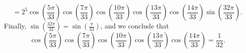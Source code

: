 \documentclass[12pt, a4paper]{article}
\begin{document}
\[
    = 2^{5}
    \cos \left( {\frac{5\pi }{33}}\right)
    \cos \left( {\frac{7\pi }{33}}\right)
    \cos \left( {\frac{10\pi }{33}}\right)
    \cos \left( {\frac{13\pi }{33}}\right)
    \cos \left( {\frac{14\pi }{33}}\right)
    \sin \left( {\frac{32\pi }{33}}\right).
\]
Finally, $\sin \left( {\frac{32\pi }{33}}\right) = \sin \left( {\frac{\pi }{33}}\right)$, and we conclude that
\[
    \cos \left( {\frac{5\pi }{33}}\right)
    \cos \left( {\frac{7\pi }{33}}\right)
    \cos \left( {\frac{10\pi }{33}}\right)
    \cos \left( {\frac{13\pi }{33}}\right)
    \cos \left( {\frac{14\pi }{33}}\right)
    =\frac {1}{32}.
\]
\printbibliography
\end{document}
